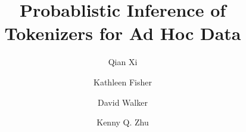 \documentclass{llncs}
\begin{document}
\title{Probablistic Inference of Tokenizers for Ad Hoc Data}

\author{Qian Xi \and Kathleen Fisher \and David Walker 
  \and Kenny Q. Zhu}




\maketitle{}







%



%
%


%
\end{document}
